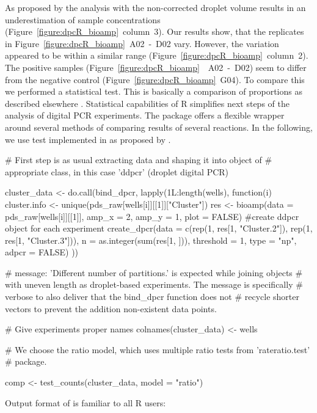 As proposed by \citet{corbisier_2015} the analysis with the non-corrected 
droplet volume results in an underestimation of sample concentrations 
(Figure~\ref{figure:dpcR_bioamp}~column~3). Our results show, that the 
replicates in Figure~\ref{figure:dpcR_bioamp}~A02~-~D02 vary. However, the 
variation appeared to be within a similar range 
(Figure~\ref{figure:dpcR_bioamp}~column~2). The positive samples 
(Figure~\ref{figure:dpcR_bioamp}~~A02~-~D02) seem to differ from the negative 
control (Figure~\ref{figure:dpcR_bioamp}~G04). To compare this we performed a 
statistical test. This is basically a comparison of proportions as described 
elsewhere \citep{wang_2013}. Statistical capabilities of R simplifies next steps 
of the analysis of digital PCR experiments. The  package offers a 
flexible wrapper  around several methods of comparing results 
of several reactions. In the following, we use test implemented in 
 as proposed by \citet{Fay_2010}.

\begin{example}
# First step is as usual extracting data and shaping it into object of 
# appropriate class, in this case 'ddpcr' (droplet digital PCR)

cluster_data <- do.call(bind_dpcr, lapply(1L:length(wells), function(i) {
cluster.info <- unique(pds_raw[wells[i]][[1]]["Cluster"])
res <- bioamp(data = pds_raw[wells[i]][[1]], amp_x = 2, amp_y = 1, plot = FALSE)
#create ddpcr object for each experiment
create_dpcr(data = c(rep(1, res[1, "Cluster.2"]), rep(1, res[1, "Cluster.3"])), 
	    n = as.integer(sum(res[1, ])), threshold = 1, 
	    type = "np", adpcr = FALSE)
}))

# message: 'Different number of partitions.' is expected while joining objects
# with uneven length as droplet-based experiments. The message is specifically
# verbose to also deliver that the bind_dpcr function does not
# recycle shorter vectors to prevent the addition non-existent data points.

# Give experiments proper names
colnames(cluster_data) <- wells

# We choose the ratio model, which uses multiple ratio tests from 'rateratio.test'
# package.

comp <- test_counts(cluster_data, model = "ratio")
\end{example}

Output format of  is familiar to all R users:

